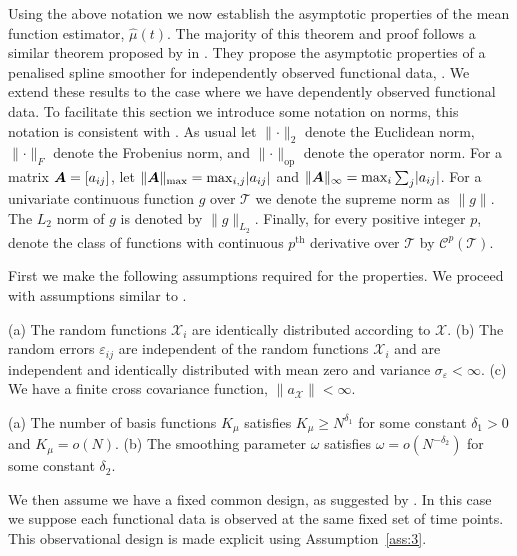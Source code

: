 Using the above notation we now establish the asymptotic properties of the mean function estimator, $\hat{\mu}(t)$. 
The majority of this theorem and proof follows a similar theorem proposed by \citeauthor{xiao_asymptotic_2020} in \citep{xiao_asymptotic_2020}.
They propose the asymptotic properties of a penalised spline smoother for independently observed functional data, \citep{xiao_asymptotic_2020}.
We extend these results to the case where we have dependently observed functional data.
To facilitate this section we introduce some notation on norms, this notation is consistent with \citep{xiao_asymptotic_2020}. 
As usual let $\lVert \cdot \rVert_2$ denote the Euclidean norm, $\lVert \cdot \rVert_{F}$ denote the Frobenius norm, and $\lVert \cdot \rVert_\text{op}$ denote the operator norm.
For a matrix $\bm{{A}} = \left[a_{ij}\right]$, let $\lVert \bm{{A}} \rVert_\text{max} = \max_{i,j} \lvert a_{ij} \rvert$ and $\lVert \bm{{A}} \rVert_\infty = \max_i \sum_j \lvert a_{ij} \rvert$.
For a univariate continuous function $g$ over $\mathcal{T}$ we denote the supreme norm as $\lVert g \rVert$.
The $L_2$ norm of $g$ is denoted by $\lVert g \rVert_{L_2}$.
Finally, for every positive integer $p$, denote the class of functions with continuous $p^\text{th}$ derivative over $\mathcal{T}$ by $\mathcal{C}^p(\mathcal{T})$.

First we make the following assumptions required for the properties. 
We proceed with assumptions similar to \citep{xiao_asymptotic_2020}. 
\begin{assumption}
	(a) The random functions $\mathcal{X}_i$ are identically distributed according to $\mathcal{X}$. (b) The random errors $\varepsilon_{ij}$ are independent of the random functions $\mathcal{X}_i$ and are independent and identically distributed with mean zero and variance $\sigma_\varepsilon < \infty$. (c) We have a finite cross covariance function, $\lVert a_\mathcal{X}\rVert < \infty$. 
	\label{ass:1}
\end{assumption}

\begin{assumption}
	(a) The number of basis functions $K_\mu$ satisfies $K_\mu \geq N^{\delta_1}$ for some constant $\delta_1 > 0$ and $K_\mu = o(N)$. (b) The smoothing parameter  $\omega$ satisfies $\omega = o(N^{-\delta_2})$ for some constant $\delta_2$. 
	\label{ass:2}
\end{assumption}

We then assume we have a fixed common design, as suggested by \citep{xiao_asymptotic_2020}. In this case we suppose each functional data is observed at the same fixed set of time points. This observational design is made explicit using Assumption~\ref{ass:3}. 

